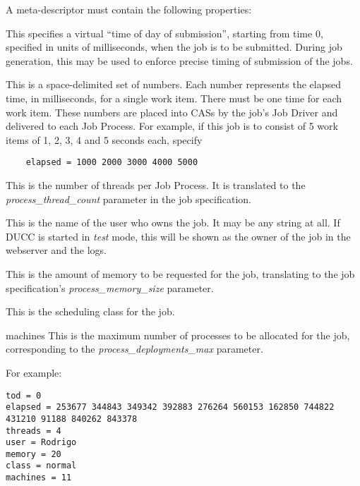      A meta-descriptor must contain the following properties:
     \begin{description}
       \item[tod] This specifies a virtual ``time of day of submission'', starting from time 0, specified
         in units of milliseconds, when the job is to be submitted.  During job generation, this may
         be used to enforce precise timing of submission of the jobs.
       \item[elapsed] This is a space-delimited set of numbers.  Each number represents the elapsed time,
         in milliseconds, for a single work item.  There must be one time for each work item.  
         These numbers are placed into CASs by the job's Job Driver and delivered to each Job Process.
         For example,
         if this job is to consist of 5 work items of 1, 2, 3, 4 and 5 seconds each, specify
\begin{verbatim}
    elapsed = 1000 2000 3000 4000 5000
\end{verbatim}
       \item[threads] This is the number of threads per Job Process.  It is translated to the
         {\em process\_thread\_count} parameter in the job specification.
       \item[user] This is the name of the user who owns the job.  It may be any string at
         all.  If DUCC is started in {\em test} mode, this will be shown as the owner of 
         the job in the webserver and the logs.
       \item[memory] This is the amount of memory to be requested for the job, translating
         to the job specification's {\em process\_memory\_size} parameter.
       \item[class] This is the scheduling class for the job.

       \begin{sloppypar}
       \item[machines] This is the maximum number of processes to be allocated for the
         job, corresponding to the {\em process\_deployments\_max} parameter.
       \end{sloppypar}

       \end{description}
       
       For example:
\begin{verbatim}
tod = 0
elapsed = 253677 344843 349342 392883 276264 560153 162850 744822 431210 91188 840262 843378 
threads = 4
user = Rodrigo
memory = 20
class = normal
machines = 11
\end{verbatim}

